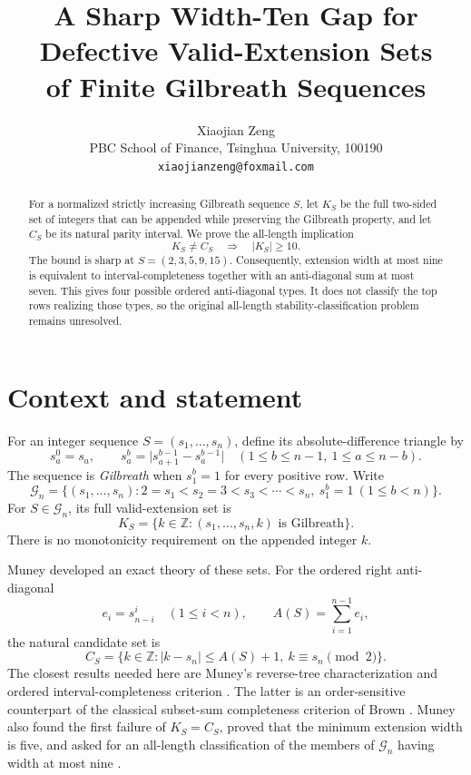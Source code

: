 \documentclass[11pt]{article}
\title{A Sharp Width-Ten Gap for Defective Valid-Extension Sets\\
of Finite Gilbreath Sequences}
\author{Xiaojian Zeng\\
PBC School of Finance, Tsinghua University, 100190\\
\texttt{xiaojianzeng@foxmail.com}}
\date{}
\theoremstyle{remark}
\newcommand{\G}{\mathcal G}
\newcommand{\Z}{\mathbb Z}
\begin{document}
\maketitle

\begin{abstract}
For a normalized strictly increasing Gilbreath sequence $S$, let $K_S$ be
the full two-sided set of integers that can be appended while preserving the
Gilbreath property, and let $C_S$ be its natural parity interval.  We prove
the all-length implication
\[
  K_S\ne C_S \quad\Longrightarrow\quad |K_S|\ge 10.
\]
The bound is sharp at $S=(2,3,5,9,15)$.  Consequently, extension width at
most nine is equivalent to interval-completeness together with an
anti-diagonal sum at most seven.  This gives four possible ordered
anti-diagonal types.  It does not classify the top rows realizing those
types, so the original all-length stability-classification problem remains
unresolved.
\end{abstract}

\section{Context and statement}

For an integer sequence $S=(s_1,\ldots,s_n)$, define its absolute-difference
triangle by
\[
 s_a^0=s_a,\qquad
 s_a^b=\lvert s_{a+1}^{b-1}-s_a^{b-1}\rvert
 \quad(1\le b\le n-1,\ 1\le a\le n-b).
\]
The sequence is \emph{Gilbreath} when $s_1^b=1$ for every positive row.
Write
\[
 \G_n=\{(s_1,\ldots,s_n):2=s_1<s_2=3<s_3<\cdots<s_n,
               \ s_1^b=1\ (1\le b<n)\}.
\]
For $S\in\G_n$, its full valid-extension set is
\[
 K_S=\{k\in\Z:(s_1,\ldots,s_n,k)\text{ is Gilbreath}\}.
\]
There is no monotonicity requirement on the appended integer $k$.

Muney \cite{Muney2026} developed an exact theory of these sets.  For the
ordered right anti-diagonal
\[
 e_i=s_{n-i}^i\quad(1\le i<n),\qquad
 A(S)=\sum_{i=1}^{n-1}e_i,
\]
the natural candidate set is
\[
 C_S=\{k\in\Z:|k-s_n|\le A(S)+1,
                     \ k\equiv s_n\pmod 2\}.
\]
The closest results needed here are Muney's reverse-tree characterization
and ordered interval-completeness criterion \cite[Proposition~18 and
Theorem~20]{Muney2026}.  The latter is an order-sensitive counterpart of
the classical subset-sum completeness criterion of Brown
\cite{Brown1961}.  Muney also found the first failure of $K_S=C_S$, proved
that the minimum extension width is five, and asked for an all-length
classification of the members of $\G_n$ having width at most nine
\cite[Theorems~24--25 and Question~16(5)]{Muney2026}.
\end{document}
